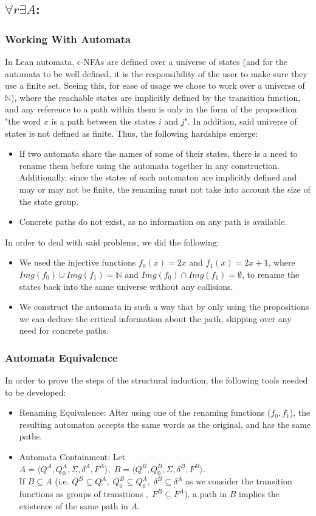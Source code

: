 \documentclass[]{article}
\begin{document}
\subsection{$\forall r \exists A$:}
\subsubsection{Working With Automata}
In Lean automata, $\epsilon$-NFAs are defined over a universe of states (and for the automata to be well defined, it is the responsibility of the user to make sure they use a finite set. Seeing this, for ease of usage we chose to work over a universe of $\mathbb{N}$), where the reachable states are implicitly defined by the transition function, and any reference to a path within them is only in the form of the proposition "the word $x$ is a path between the states $i$ and $j$". In addition, said universe of states is not defined as finite. Thus, the following hardships emerge:
\begin{itemize}
	\item 
	If two automata share the names of some of their states, there is a need to rename them before using the automata together in any construction. Additionally, since the states of each automaton are implicitly defined and may or may not be finite, the renaming must not take into account the size of the state group.
	\item 
	Concrete paths do not exist, as no information on any path is available.
\end{itemize}
In order to deal with said problems, we did the following:
\begin{itemize}
	\item 
	We used the injective functions $f_0(x) = 2x$ and $f_1(x) = 2x + 1$, where $Img(f_0) \cup Img(f_1) = \mathbb{N}$ and $Img(f_0) \cap Img(f_1) = \emptyset$, to rename the states back into the same universe without any collisions.
	\item 
	We construct the automata in such a way that by only using the propositions we can deduce the critical information about the path, skipping over any need for concrete paths.
\end{itemize}
\subsubsection{Automata Equivalence}
In order to prove the steps of the structural induction, the following tools needed to be developed:
\begin{itemize}
	\item 
	Renaming Equivalence: After using one of the renaming functions ($f_0,f_1$), the resulting automaton accepts the same words as the original, and has the same paths.
	\item 
	Automata Containment: Let $A = \langle Q^A, Q_0^A, \Sigma, \delta^A, F^A \rangle,\; B = \langle Q^B, Q_0^B, \Sigma, \delta^B, F^B \rangle$.\\ If $B \subseteq A$ (i.e. $Q^B \subseteq Q^A,\; Q_0^B \subseteq Q_0^A,\; \delta^B \subseteq \delta^A$ as we consider the transition functions as groups of transitions $,\; F^B \subseteq F^A$), a path in $B$ implies the existence of the same path in $A$.
\end{itemize}
\end{document}
